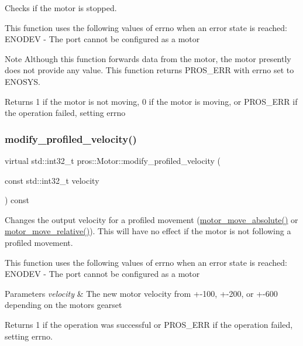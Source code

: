 Checks if the motor is stopped.

This function uses the following values of errno when an error state is reached\+: E\+N\+O\+D\+EV -\/ The port cannot be configured as a motor

\begin{DoxyNote}{Note}
Although this function forwards data from the motor, the motor presently does not provide any value. This function returns P\+R\+O\+S\+\_\+\+E\+RR with errno set to E\+N\+O\+S\+YS.
\end{DoxyNote}
\begin{DoxyReturn}{Returns}
1 if the motor is not moving, 0 if the motor is moving, or P\+R\+O\+S\+\_\+\+E\+RR if the operation failed, setting errno 
\end{DoxyReturn}
\mbox{\label{classpros_1_1Motor_a44f39232cec1caee6d668d8ff21dc28b}} 
\subsubsection{\texorpdfstring{modify\+\_\+profiled\+\_\+velocity()}{modify\_profiled\_velocity()}}
{\footnotesize\ttfamily virtual std\+::int32\+\_\+t pros\+::\+Motor\+::modify\+\_\+profiled\+\_\+velocity (\begin{DoxyParamCaption}\item[{const std\+::int32\+\_\+t}]{velocity }\end{DoxyParamCaption}) const\hspace{0.3cm}{\ttfamily [virtual]}}

Changes the output velocity for a profiled movement (\hyperlink{motors_8h_ab70bf4937f1b5cefa15c11c15314c90e}{motor\+\_\+move\+\_\+absolute()} or \hyperlink{motors_8h_ab4c1ba35d69e8e9b49df0e848fa305d3}{motor\+\_\+move\+\_\+relative()}). This will have no effect if the motor is not following a profiled movement.

This function uses the following values of errno when an error state is reached\+: E\+N\+O\+D\+EV -\/ The port cannot be configured as a motor


\begin{DoxyParams}{Parameters}
{\em velocity} & The new motor velocity from +-\/100, +-\/200, or +-\/600 depending on the motor\textquotesingle{}s gearset\\
\hline
\end{DoxyParams}
\begin{DoxyReturn}{Returns}
1 if the operation was successful or P\+R\+O\+S\+\_\+\+E\+RR if the operation failed, setting errno. 
\end{DoxyReturn}
\mbox{\label{classpros_1_1Motor_a7ea9aedd4e12844be2584dc3f4b7a4bf}} 
